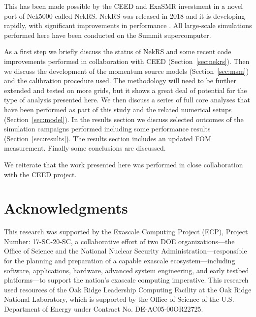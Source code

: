 \documentclass[11pt]{anlreport}
\begin{document}
This has been made possible by the CEED and ExaSMR investment in a novel port of Nek5000 called NekRS. NekRS was released in 2018 and it is developing rapidly, with significant improvements in performance \cite{merzari2020toward}. All large-scale simulations performed here have been conducted on the Summit supercomputer.

As a first step we briefly discuss the status of NekRS and some recent code improvements performed in collaboration with CEED (Section~\ref{sec:nekrs}).   Then we discuss the development of the momentum source models (Section~\ref{sec:msm}) and the calibration procedure used. The methodology will need to be further extended and tested on more grids, but it shows a great deal of potential for the type of analysis presented here. We then discuss a series of full core analyses that have been performed as part of this study and the related numerical setups (Section~\ref{sec:model}). In the results section we discuss selected outcomes of the simulation campaigns performed including some performance results (Section~\ref{sec:results}). The results section includes an updated FOM measurement. Finally some conclusions are discussed.

We reiterate  that the work presented here was performed in close collaboration with the CEED project.









\section*{Acknowledgments}

This research was supported by the Exascale Computing Project (ECP), Project
Number: 17-SC-20-SC, a collaborative effort of two DOE organizations---the
Office of Science and the National Nuclear Security Administration---responsible
for the planning and preparation of a capable exascale ecosystem---including
software, applications, hardware, advanced system engineering, and early testbed
platforms---to support the nation's exascale computing imperative. This research
used resources of the Oak Ridge Leadership Computing Facility at the Oak Ridge
National Laboratory, which is supported by the Office of Science of the U.S.
Department of Energy under Contract No. DE-AC05-00OR22725.
\end{document}
